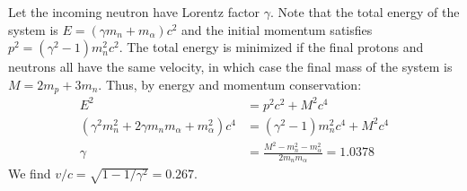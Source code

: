\begin{solution}
Let the incoming neutron have Lorentz factor $\gamma$. Note that the total energy of the system is $E =(\gamma m_n + m_\alpha)c^2$ and the initial momentum satisfies $p^2 = (\gamma^2 - 1)m_n^2 c^2$. The total energy is minimized if the final protons and neutrons all have the same velocity, in which case the final mass of the system is $M=2m_p + 3m_n$. Thus, by energy and momentum conservation:
\begin{align*}E^2 &= p^2 c^2 + M^2 c^4\\ (\gamma^2 m_n^2 + 2\gamma m_n m_\alpha + m_\alpha ^2)c^4 &= (\gamma^2 - 1)m_n^2 c^4 + M^2 c^4\\ \gamma &= \frac{M^2 - m_n^2 - m_\alpha^2}{2m_n m_\alpha} = 1.0378\end{align*}
We find $v/c = \sqrt{1 - 1/\gamma^2} = \boxed{0.267}$.
\end{solution}